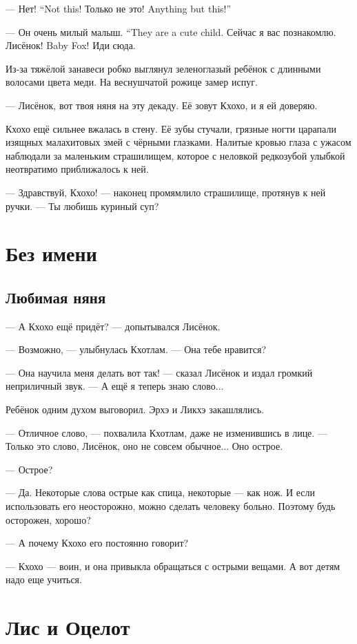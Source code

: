 {--- Нет!}
{``Not this!}
{Только не это!}
{Anything but this!''}

{--- Он очень милый малыш.}
{``They are a cute child.}
Сейчас я вас познакомлю.
{Лисёнок!}
{Baby Fox!}
Иди сюда.

Из-за тяжёлой занавеси робко выглянул зеленоглазый ребёнок с длинными волосами цвета меди.
На веснушчатой рожице замер испуг.

--- Лисёнок, вот твоя няня на эту декаду.
Её зовут Кхохо, и я ей доверяю.

Кхохо ещё сильнее вжалась в стену.
Её зубы стучали, грязные ногти царапали изящных малахитовых змей с чёрными глазками.
Налитые кровью глаза с ужасом наблюдали за маленьким страшилищем, которое с неловкой редкозубой улыбкой неотвратимо приближалось к ней.

--- Здравствуй, Кхохо! --- наконец промямлило страшилище, протянув к ней ручки.
--- Ты любишь куриный суп?

\chapter{Без имени}

\section{Любимая няня}

--- А Кхохо ещё придёт? --- допытывался Лисёнок.

--- Возможно, --- улыбнулась Кхотлам.
--- Она тебе нравится?

--- Она научила меня делать вот так! --- сказал Лисёнок и издал громкий неприличный звук.
--- А ещё я теперь знаю слово...

Ребёнок одним духом выговорил.
Эрхэ и Ликхэ закашлялись.

--- Отличное слово, --- похвалила Кхотлам, даже не изменившись в лице.
--- Только это слово, Лисёнок, оно не совсем обычное...
Оно острое.

--- Острое?

--- Да.
Некоторые слова острые как спица, некоторые --- как нож.
И если использовать его неосторожно, можно сделать человеку больно.
Поэтому будь осторожен, хорошо?

--- А почему Кхохо его постоянно говорит?

--- Кхохо --- воин, и она привыкла обращаться с острыми вещами.
А вот детям надо еще учиться.

\chapter{Лис и Оцелот}

